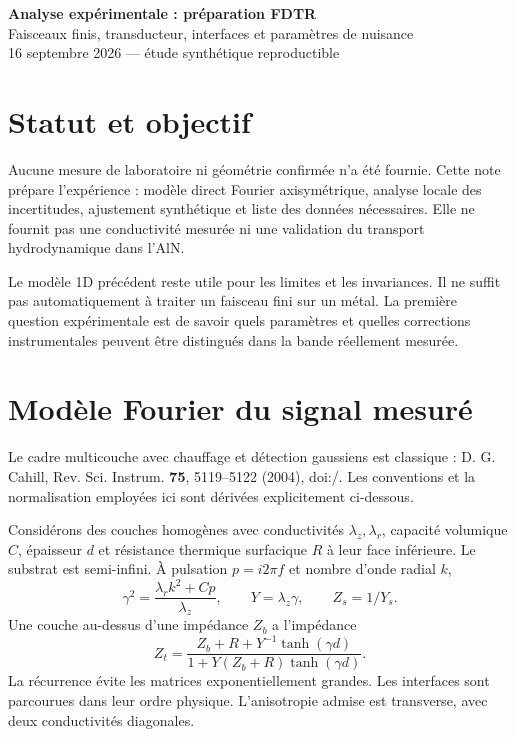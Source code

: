 \documentclass[11pt,a4paper]{article}
\begin{document}
\begin{center}
{\Large\bfseries Analyse expérimentale : préparation FDTR}\\[4pt]
{\normalsize Faisceaux finis, transducteur, interfaces et paramètres de nuisance}\\[2pt]
{\small 16 septembre 2026 --- étude synthétique reproductible}
\end{center}

\section{Statut et objectif}
Aucune mesure de laboratoire ni géométrie confirmée n'a été fournie.
Cette note prépare l'expérience : modèle direct Fourier axisymétrique,
analyse locale des incertitudes, ajustement synthétique et liste des données
nécessaires. Elle ne fournit pas une conductivité mesurée ni une validation
du transport hydrodynamique dans l'AlN.

Le modèle 1D précédent reste utile pour les limites et les invariances.
Il ne suffit pas automatiquement à traiter un faisceau fini sur un métal.
La première question expérimentale est de savoir quels paramètres et quelles
corrections instrumentales peuvent être distingués dans la bande réellement mesurée.

\section{Modèle Fourier du signal mesuré}
Le cadre multicouche avec chauffage et détection gaussiens est classique :
D. G. Cahill, Rev. Sci. Instrum. \textbf{75}, 5119--5122 (2004),
doi:/. Les conventions et la
normalisation employées ici sont dérivées explicitement ci-dessous.

Considérons des couches homogènes avec conductivités $\lambda_z,\lambda_r$,
capacité volumique $C$, épaisseur $d$ et résistance thermique surfacique $R$
à leur face inférieure. Le substrat est semi-infini.
À pulsation $p=i2\pi f$ et nombre d'onde radial $k$,
\[
 \gamma^2=\frac{\lambda_r k^2+Cp}{\lambda_z},\qquad
 Y=\lambda_z\gamma,\qquad Z_s=1/Y_s.
\]
Une couche au-dessus d'une impédance $Z_b$ a l'impédance
\[
 Z_t=\frac{Z_b+R+Y^{-1}\tanh(\gamma d)}
           {1+Y(Z_b+R)\tanh(\gamma d)}.
\]
La récurrence évite les matrices exponentiellement grandes.
Les interfaces sont parcourues dans leur ordre physique.
L'anisotropie admise est transverse, avec deux conductivités diagonales.
\end{document}
